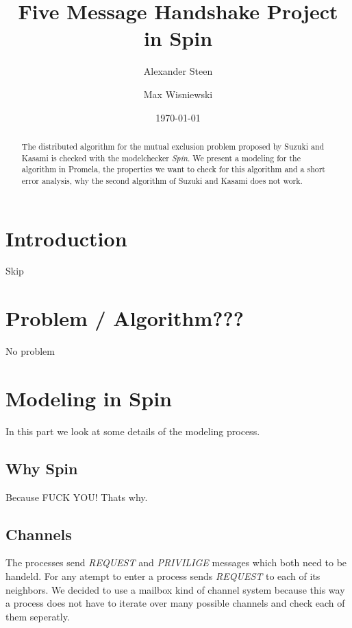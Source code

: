 \documentclass{llncs}
\title{Five Message Handshake Project in Spin}
\author{Alexander Steen \and Max Wisniewski}
\date{\today}
\institute{Institut f\"ur Informatik, FU Berlin}
\begin{document}
\maketitle

\begin{abstract}
The distributed algorithm for the mutual exclusion problem proposed by Suzuki and Kasami \cite{Suzuki:1985:DME:6110.214406} is checked
with the modelchecker \emph{Spin}. We present a modeling for the algorithm in Promela, the properties we want
to check for this algorithm and a short error analysis, why the second algorithm of Suzuki and Kasami does not work.
\end{abstract}



\section{Introduction}

Skip



\section{Problem / Algorithm???}

No problem



\section{Modeling in Spin}

In this part we look at some details of the modeling process.

\subsection{Why Spin}

Because FUCK YOU! Thats why.

\subsection{Channels}

The processes send \emph{REQUEST} and \emph{PRIVILIGE} messages which both
need to be handeld. For any atempt to enter a process sends \emph{REQUEST} to
each of its neighbors. We decided to use a mailbox kind of channel system because
this way a process does not have to iterate over many possible channels and check
each of them seperatly.
\end{document}
